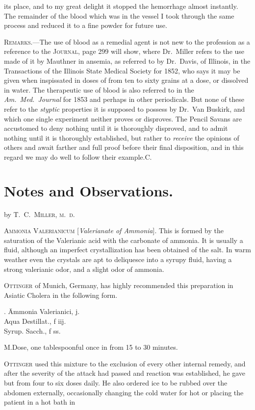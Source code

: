 its place, and to my great delight it stopped the hemorrhage almost
instantly. The remainder of the blood which was in the vessel I took
through the same process and reduced it to a fine powder for future use.

\textsc{Remarks}.---The use of blood as a remedial agent is not new to the
profession as a reference to the \textsc{Journal}, page 299 will show, where
Dr.\ Miller refers to the use made of it by Mauthner in ansemia, as
referred to by Dr.\ Davis, of Illinois, in the Transactions of the Illinois
State Medical Society for 1852, who says it may be given when inspissated
in doses of from ten to sixty grains at a dose, or dissolved in
water. The therapeutic use of blood is also referred to in the \emph{Am.\ Med.\ Journal}
for 1853 and perhaps in other periodicals. But none of
these refer to the \emph{styptic} properties it is supposed to possess by Dr.\ Van
Buskirk, and which one single experiment neither proves or disproves.
The Pencil Savans are accustomed to deny nothing until it is
thoroughly disproved, and to admit nothing until it is thoroughly established,
but rather to \emph{receive} the opinions of others and await farther
and full proof before their final disposition, and in this regard we may
do well to follow their example.\hfill{}C.

\section*{Notes and Observations.}

by \textsc{T.\ C.\ Miller, m.\ d.}

\textsc{Ammonia Valerianicum} [\emph{Valerianate of Ammonia}]. This is formed
by the saturation of the Valerianic acid with the carbonate of ammonia.
It is usually a fluid, although an imperfect crystallization has been obtained
of the salt. In warm weather even the crystals are apt to deliquesce
into a syrupy fluid, having a strong valerianic odor, and a
slight odor of ammonia.

\textsc{Ottinger} of Munich, Germany, has highly recommended this preparation
in Asiatic Cholera in the following form.

\begin{center}
\begin{tabbing}
  \prescription. \= Ammonia Valerianici, \scruple j. \\
    \> Aqua Destillat., f \ounce iij. \\
    \> Syrup. Sacch., f \ounce ss.
\end{tabbing}
\end{center}

M.\quad{}Dose, one tablespoonful once in from 15 to 30 minutes.

\textsc{Ottinger} used this mixture to the exclusion of every other internal
remedy, and after the severity of the attack had passed and reaction
was established, he gave but from four to six doses daily. He also
ordered ice to be rubbed over the abdomen externally, occasionally
changing the cold water for hot or placing the patient in a hot bath in\endinput
